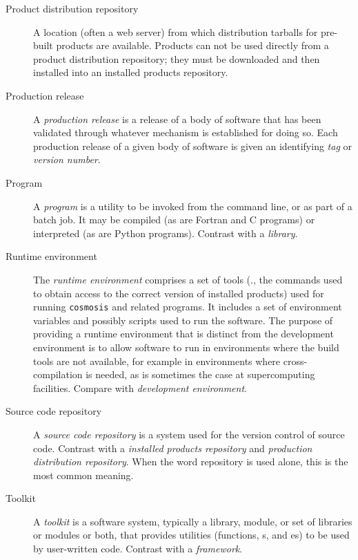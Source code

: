 \documentclass[draftmode,draftwater]{memarticle}
\newcommand{\prog}[1]%
  {\texttt{#1}}
\begin{document}
\begin{description}
\item[Product distribution repository] A location (often a web server)
  from which distribution tarballs for pre-built products are available.
  Products can not be used directly from a product distribution
  repository; they must be downloaded and then installed into an
  installed products repository.

\item[Production release] A \emph{production release} is a release of a
  body of software that has been validated through whatever mechanism is
  established for doing so. Each production release of a given body of
  software is given an identifying \emph{tag} or \emph{version number}.

\item[Program] A \emph{program} is a utility to be invoked from the
  command line, or as part of a batch job. It may be compiled (as are
  Fortran and C programs) or interpreted (as are Python programs).
  Contrast with a \emph{library}.

\item[Runtime environment] The \emph{runtime environment} comprises a
  set of tools (\eg., the commands used to obtain access to the correct
  version of installed products) used for running \prog{cosmosis} and
  related programs. It includes a set of environment variables and
  possibly scripts used to run the software. The purpose of providing a
  runtime environment that is distinct from the development environment
  is to allow software to run in environments where the build tools are
  not available, for example in environments where cross-compilation is
  needed, as is sometimes the case at supercomputing facilities. Compare
  with \emph{development environment}.

\item[Source code repository] A \emph{source code repository} is a
  system used for the version control of source code. Contrast with a
  \emph{installed products repository} and \emph{production distribution
    repository}. When the word repository is used alone, this is the
  most common meaning.

\item[Toolkit] A \emph{toolkit} is a software system, typically a
  library, module, or set of libraries or modules or both, that provides
  utilities (functions, s, and es) to be used
  by user-written code. Contrast with a \emph{framework}.

\end{description}
\end{document}
